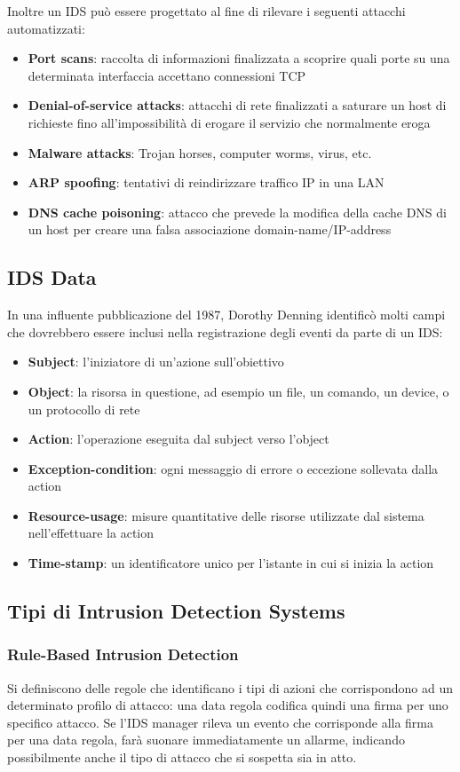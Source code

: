Inoltre un IDS può essere progettato al fine di rilevare i seguenti attacchi automatizzati:
\begin{itemize}
\item \textbf{Port scans}: raccolta di informazioni finalizzata a scoprire quali porte su una determinata interfaccia accettano connessioni TCP
\item \textbf{Denial-of-service attacks}: attacchi di rete finalizzati a saturare un host di richieste fino all'impossibilità di erogare il servizio che normalmente eroga
\item \textbf{Malware attacks}: Trojan horses, computer worms, virus, etc.
\item \textbf{ARP spoofing}: tentativi di reindirizzare traffico IP in una LAN
\item \textbf{DNS cache poisoning}: attacco che prevede la modifica della cache DNS di un host per creare una falsa associazione domain-name/IP-address 
\end{itemize}

\subsection{IDS Data} 
In una influente pubblicazione del 1987, Dorothy Denning identificò molti campi che dovrebbero essere inclusi nella registrazione degli eventi da parte di un IDS:
\begin{itemize}
\item \textbf{Subject}: l'iniziatore di un'azione sull'obiettivo
\item \textbf{Object}: la risorsa in questione, ad esempio un file, un comando, un device, o un protocollo di rete
\item \textbf{Action}: l'operazione eseguita dal subject verso l'object
\item \textbf{Exception-condition}: ogni messaggio di errore o eccezione sollevata dalla action
\item \textbf{Resource-usage}: misure quantitative delle risorse utilizzate dal sistema nell'effettuare la action
\item \textbf{Time-stamp}: un identificatore unico per l'istante in cui si inizia la action
\end{itemize}

\subsection{Tipi di Intrusion Detection Systems} 
\subsubsection{Rule-Based Intrusion Detection} 
Si definiscono delle regole che identificano i tipi di azioni che corrispondono ad un determinato profilo di attacco: una data regola codifica quindi una firma per uno specifico attacco. Se l'IDS manager rileva un evento che corrisponde alla firma per una data regola, farà suonare immediatamente un allarme, indicando possibilmente anche il tipo di attacco che si sospetta sia in atto.

